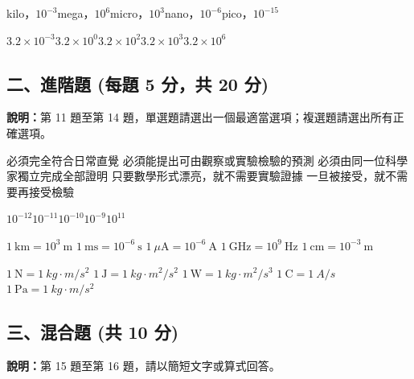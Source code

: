 \documentclass[10pt,a4paper]{article}
\begin{document}
{kilo，$10^{-3}$}{mega，$10^6$}{micro，$10^3$}{nano，$10^{-6}$}{pico，$10^{-15}$}

{$3.2\times 10^{-3}$}{$3.2\times 10^0$}{$3.2\times 10^2$}{$3.2\times 10^3$}{$3.2\times 10^6$}

\subsection*{二、進階題 (每題 5 分，共 20 分)}
\begin{center}
    \begin{tcolorbox}[colframe=black, colback=white, halign=left, width=\textwidth, arc=2mm]
        \small \textbf{說明：}第 11 題至第 14 題，單選題請選出一個最適當選項；複選題請選出所有正確選項。
    \end{tcolorbox}
\end{center}

{必須完全符合日常直覺}
{必須能提出可由觀察或實驗檢驗的預測}
{必須由同一位科學家獨立完成全部證明}
{只要數學形式漂亮，就不需要實驗證據}
{一旦被接受，就不需要再接受檢驗}

{$10^{-12}$}{$10^{-11}$}{$10^{-10}$}{$10^{-9}$}{$10^{11}$}

{$1\ \text{km}=10^3\ \text{m}$}
{$1\ \text{ms}=10^{-6}\ \text{s}$}
{$1\ \mu\text{A}=10^{-6}\ \text{A}$}
{$1\ \text{GHz}=10^9\ \text{Hz}$}
{$1\ \text{cm}=10^{-3}\ \text{m}$}

{$1\ \text{N}=1\ kg\cdot m/s^2$}
{$1\ \text{J}=1\ kg\cdot m^2/s^2$}
{$1\ \text{W}=1\ kg\cdot m^2/s^3$}
{$1\ \text{C}=1\ A/s$}
{$1\ \text{Pa}=1\ kg\cdot m/s^2$}

\subsection*{三、混合題 (共 10 分)}
\begin{center}
    \begin{tcolorbox}[colframe=black, colback=white, halign=left, width=\textwidth, arc=2mm]
        \small \textbf{說明：}第 15 題至第 16 題，請以簡短文字或算式回答。
    \end{tcolorbox}
\end{center}
\end{document}
